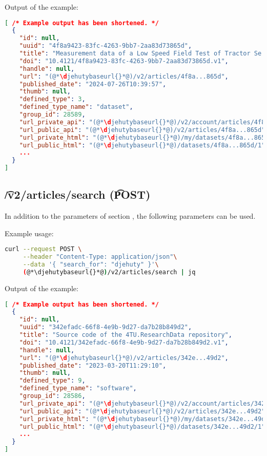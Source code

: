  Output of the example:
\begin{lstlisting}[language=JSON]
[ /* Example output has been shortened. */
  {
    "id": null,
    "uuid": "4f8a9423-83fc-4263-9bb7-2aa83d73865d",
    "title": "Measurement data of a Low Speed Field Test of Tractor Se...",
    "doi": "10.4121/4f8a9423-83fc-4263-9bb7-2aa83d73865d.v1",
    "handle": null,
    "url": "(@*\djehutybaseurl{}*@)/v2/articles/4f8a...865d",
    "published_date": "2024-07-26T10:39:57",
    "thumb": null,
    "defined_type": 3,
    "defined_type_name": "dataset",
    "group_id": 28589,
    "url_private_api": "(@*\djehutybaseurl{}*@)/v2/account/articles/4f8a...865d",
    "url_public_api": "(@*\djehutybaseurl{}*@)/v2/articles/4f8a...865d",
    "url_private_html": "(@*\djehutybaseurl{}*@)/my/datasets/4f8a...865d/edit",
    "url_public_html": "(@*\djehutybaseurl{}*@)/datasets/4f8a...865d/1",
    ...
  }
]
\end{lstlisting}

\subsection{\t{/v2/articles/search} (\t{POST})}
\label{sec:api-v2-articles-search-post}

  In addition to the parameters of section , the
  following parameters can be used.

  \searchParameters

  Example usage:
\begin{lstlisting}[language=bash]
curl --request POST \
     --header "Content-Type: application/json"\
     --data '{ "search_for": "djehuty" }'\
     (@*\djehutybaseurl{}*@)/v2/articles/search | jq
\end{lstlisting}

  Output of the example:
\begin{lstlisting}[language=JSON]
[ /* Example output has been shortened. */
  {
    "id": null,
    "uuid": "342efadc-66f8-4e9b-9d27-da7b28b849d2",
    "title": "Source code of the 4TU.ResearchData repository",
    "doi": "10.4121/342efadc-66f8-4e9b-9d27-da7b28b849d2.v1",
    "handle": null,
    "url": "(@*\djehutybaseurl{}*@)/v2/articles/342e...49d2",
    "published_date": "2023-03-20T11:29:10",
    "thumb": null,
    "defined_type": 9,
    "defined_type_name": "software",
    "group_id": 28586,
    "url_private_api": "(@*\djehutybaseurl{}*@)/v2/account/articles/342e...49d2",
    "url_public_api": "(@*\djehutybaseurl{}*@)/v2/articles/342e...49d2",
    "url_private_html": "(@*\djehutybaseurl{}*@)/my/datasets/342e...49d2/edit",
    "url_public_html": "(@*\djehutybaseurl{}*@)/datasets/342e...49d2/1",
    ...
  }
]
\end{lstlisting}

